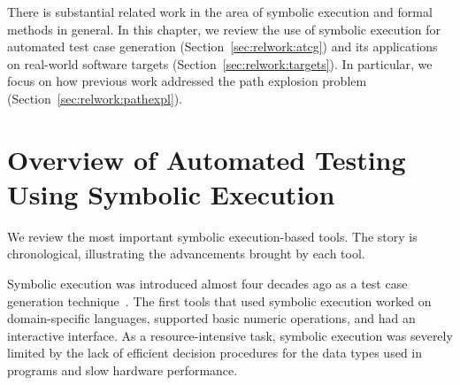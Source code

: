 There is substantial related work in the area of symbolic execution and formal methods in general.  In this chapter, we review the use of symbolic execution for automated test case generation (Section~\ref{sec:relwork:atcg}) and its applications on real-world software targets (Section~\ref{sec:relwork:targets}).  In particular, we focus on how previous work addressed the path explosion problem (Section~\ref{sec:relwork:pathexpl}).


\section{Overview of Automated Testing Using Symbolic Execution}

We review the most important symbolic execution-based tools.  The story is chronological, illustrating the advancements brought by each tool.


Symbolic execution was introduced almost four decades ago as a test case generation technique~\cite{king:symbolic:2, boyer:symbolic}.  The first tools that used symbolic execution worked on domain-specific languages, supported basic numeric operations, and had an interactive interface.  As a resource-intensive task, symbolic execution was severely limited by the lack of efficient decision procedures for the data types used in programs and slow hardware performance.


